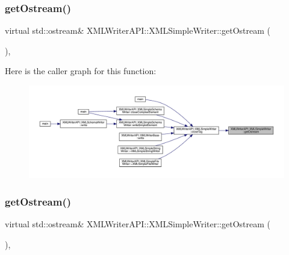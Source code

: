 \subsubsection{\texorpdfstring{getOstream()}{getOstream()}\hspace{0.1cm}{\footnotesize\ttfamily [2/3]}}
{\footnotesize\ttfamily virtual std\+::ostream\& X\+M\+L\+Writer\+A\+P\+I\+::\+X\+M\+L\+Simple\+Writer\+::get\+Ostream (\begin{DoxyParamCaption}{ }\end{DoxyParamCaption})\hspace{0.3cm}{\ttfamily [protected]}, {}}

Here is the caller graph for this function\+:
\nopagebreak
\begin{figure}[H]
\begin{center}
\leavevmode
\includegraphics[width=350pt]{d5/de1/classXMLWriterAPI_1_1XMLSimpleWriter_aaf70b3dcddd7880e838bbc266426dfd5_icgraph}
\end{center}
\end{figure}
\mbox{\label{classXMLWriterAPI_1_1XMLSimpleWriter_aaf70b3dcddd7880e838bbc266426dfd5}} 
\subsubsection{\texorpdfstring{getOstream()}{getOstream()}\hspace{0.1cm}{\footnotesize\ttfamily [3/3]}}
{\footnotesize\ttfamily virtual std\+::ostream\& X\+M\+L\+Writer\+A\+P\+I\+::\+X\+M\+L\+Simple\+Writer\+::get\+Ostream (\begin{DoxyParamCaption}{ }\end{DoxyParamCaption})\hspace{0.3cm}{\ttfamily [protected]}, {}}

